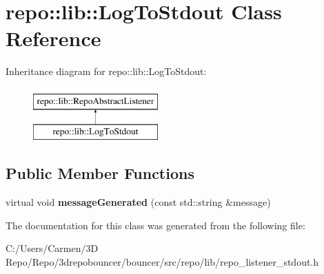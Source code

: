 \hypertarget{classrepo_1_1lib_1_1_log_to_stdout}{}\section{repo\+:\+:lib\+:\+:Log\+To\+Stdout Class Reference}
\label{classrepo_1_1lib_1_1_log_to_stdout}
Inheritance diagram for repo\+:\+:lib\+:\+:Log\+To\+Stdout\+:\begin{figure}[H]
\begin{center}
\leavevmode
\includegraphics[height=2.000000cm]{classrepo_1_1lib_1_1_log_to_stdout}
\end{center}
\end{figure}
\subsection*{Public Member Functions}
\begin{DoxyCompactItemize}
\item 
\hypertarget{classrepo_1_1lib_1_1_log_to_stdout_a85acbe84f9dd35f2ccf91a314733685f}{}virtual void {\bfseries message\+Generated} (const std\+::string \&message)\label{classrepo_1_1lib_1_1_log_to_stdout_a85acbe84f9dd35f2ccf91a314733685f}

\end{DoxyCompactItemize}


The documentation for this class was generated from the following file\+:\begin{DoxyCompactItemize}
\item 
C\+:/\+Users/\+Carmen/3\+D Repo/\+Repo/3drepobouncer/bouncer/src/repo/lib/repo\+\_\+listener\+\_\+stdout.\+h\end{DoxyCompactItemize}
